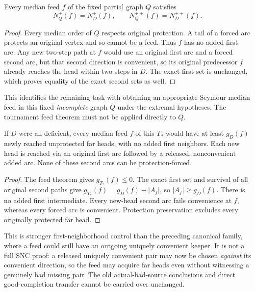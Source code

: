 \begin{corollary}
\label{cor:protection-forced-partial-feed-exact}
Every median feed $f$ of the fixed partial graph $Q$ satisfies
\[
 N_Q^+(f)=N_D^+(f),\qquad N_Q^{++}(f)=N_D^{++}(f).
\]
\end{corollary}
\begin{proof}
Every median order of $Q$ respects original protection. A tail of a
forced arc protects an original vertex and so cannot be a feed.
Thus $f$ has no added first arc. Any new two-step path at $f$ would
use an original first arc and a forced second arc, but that second
direction is convenient, so its original predecessor $f$ already
reaches the head within two steps in $D$. The exact first set is
unchanged, which proves equality of the exact second sets as well.
\end{proof}

This identifies the remaining task with obtaining an appropriate
Seymour median feed in this fixed \emph{incomplete} graph $Q$ under
the extremal hypotheses. The tournament feed theorem must not be
applied directly to $Q$.

\begin{corollary}
\label{cor:protection-forced-feed-cost}
If $D$ were all-deficient, every median feed $f$ of this $T_*$ would
have at least $g_D(f)$ newly reached unprotected far heads, with no
added first neighbors. Each new head is reached via an original
first arc followed by a released, nonconvenient added arc. None of
these second arcs can be protection-forced.
\end{corollary}
\begin{proof}
The feed theorem gives $g_{T_*}(f)\le0$. The exact first set and
survival of all original second paths give
$g_{T_*}(f)=g_D(f)-|A_f|$, so $|A_f|\ge g_D(f)$.
There is no added first intermediate. Every new-head second arc
fails convenience at $f$, whereas every forced arc is convenient.
Protection preservation excludes every originally protected far head.
\end{proof}

This is stronger first-neighborhood control than the preceding
canonical family, where a feed could still have an outgoing uniquely
convenient keeper. It is not a full SNC proof: a released uniquely
convenient pair may now be chosen \emph{against} its convenient
direction, so the feed may acquire far heads even without witnessing
a genuinely bad missing pair. The old actual-bad-source conclusions
and direct good-completion transfer cannot be carried over unchanged.

